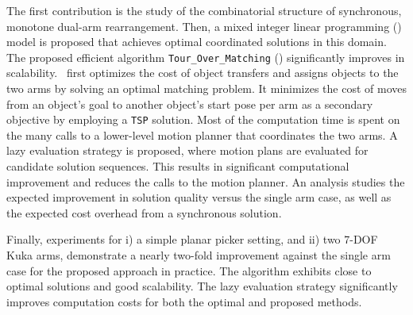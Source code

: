 The first contribution is the study of the combinatorial structure of
synchronous, monotone dual-arm rearrangement. Then, a mixed integer linear programming (\milp) model is
proposed that achieves optimal coordinated solutions in this domain.
The proposed efficient algorithm {\tt Tour\_Over\_Matching} (\algo) significantly improves in scalability. \algo\ first optimizes the
cost of object transfers and assigns objects to the two arms by
solving an optimal matching problem. It minimizes the cost of
moves from an object's goal to another object's start pose per
arm as a secondary objective by employing a {\tt TSP} solution. Most
of the computation time is spent on the many calls to a
lower-level motion planner that coordinates the two arms. A lazy
evaluation strategy is proposed, where motion plans are evaluated for candidate solution sequences. This results in significant computational improvement and
reduces the calls to the motion planner.  An analysis
studies the expected improvement in solution quality
versus the single arm case, as well as the expected cost overhead from a
synchronous solution.

Finally, experiments for i) a simple planar picker setting, and ii) two 7-DOF Kuka arms, demonstrate a nearly two-fold
improvement against the single arm case for the proposed approach in practice. The algorithm exhibits close to optimal solutions and good scalability. 
The lazy evaluation strategy significantly improves computation costs for both the optimal and proposed methods.
